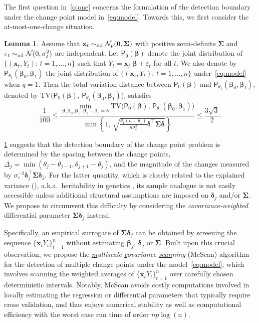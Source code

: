 \documentclass[11pt, a4paper]{article}
\newcommand{\mbf}{\mathbf}
\newcommand{\mc}{\mathcal}
\newcommand{\vep}{\varepsilon}
\newcommand{\cp}{\theta}
\newcommand{\p}{\mathsf{P}}
\newcommand{\iid}{\text{\upshape iid}}
\theoremstyle{definition}
\theoremstyle{definition}
\theoremstyle{definition}
\newtheorem{lem}[thm]{Lemma}
\theoremstyle{definition}
\theoremstyle{definition}
\theoremstyle{remark}
\theoremstyle{definition}
\theoremstyle{definition}
\theoremstyle{definition}
\begin{document}
The first question in~\ref{q:one} concerns the formulation of the detection boundary under the change point model in~\eqref{eq:model}. 
Towards this, we first consider the at-most-one-change situation.

\begin{lem}
	\label{lem:tv}
	Assume that $\mbf x_t \sim_{\iid} \mc N_p(\mbf 0, \bm\Sigma)$ with positive semi-definite $\bm\Sigma$ and $\vep_t \sim_{\iid} \mc N(0, \sigma_\vep^2)$ are independent. 
	Let $\p_0(\bm\beta)$ denote the joint distribution of $\{(\mbf x_t, Y_t): \,  t = 1, \ldots, n\}$ such that $Y_t = \mbf x_t^\top\bm\beta + \vep_t$ for all $t$. 
	We also denote by $\p_{\cp_1}(\bm\beta_0, \bm\beta_1)$ the joint distribution of $\{(\mbf x_t, Y_t): \, t = 1, \ldots, n\}$ under~\eqref{eq:model} when $q = 1$. 
	Then the total variation distance between $\p_0(\bm\beta)$ and $\p_{\cp_1}(\bm\beta_0, \bm\beta_1)$, denoted by $\mathrm{TV}\bigl( \p_0(\bm\beta),\, \p_{\cp_1}(\bm\beta_0, \bm\beta_1) \bigr)$, satisfies
	$$
	\frac{1}{100} \le \frac{\min_{\bm\beta, \bm\beta_0, \bm\beta_1: \, \bm\beta_1 - \bm\beta_0 = \bm\delta} \mathrm{TV} \bigl( \p_0(\bm\beta),\, \p_{\cp_1}(\bm\beta_0, \bm\beta_1) \bigr)}{\min\left\{ 1, \, \sqrt{\frac{\cp_1 (n - \cp_1)}{n \sigma_\vep^2}\bm\delta^\top \bm\Sigma \bm\delta}\right\}} \le \frac{3\sqrt{3}}{2}. 
	$$
\end{lem}

\cref{lem:tv} suggests that the detection boundary of the change point problem is determined by the spacing between the change points, $\Delta_j = \min(\cp_j - \cp_{j - 1}, \cp_{j + 1} - \cp_j)$,\label{ref:deltaj} and the magnitude of the changes measured by $\sigma_\vep^{-2} \bm\delta_j^\top \bm\Sigma \bm\delta_j$. 
For the latter quantity, which is closely related to the explained variance (\citealp{VerGas18, tony2020semisupervised}), a.k.a.\ heritability in genetics \citep{Mah08},
its sample analogue is not easily accessible unless additional structural assumptions are imposed on $\bm\delta_j$ and/or $\bm\Sigma$. 
We propose to circumvent this difficulty by considering the {\it covariance-weighted} differential parameter $\bm\Sigma \bm\delta_j$ instead. 

Specifically, an empirical surrogate of $\bm\Sigma \bm\delta_j$ can be obtained by screening the sequence $\{\mbf x_t Y_t \}_{t = 1}^n$ without estimating $\bm\beta_j$, $\bm\delta_j$ or $\bm\Sigma$. 
Built upon this crucial observation, we propose the {\it \underline{m}ultiscale \underline{c}ovariance \underline{scan}ning} (McScan) algorithm for the detection of multiple change points under the model~\eqref{eq:model}, which involves scanning the weighted averages of $\{\mbf x_t Y_t\}_{t = 1}^n$ over carefully chosen deterministic intervals. Notably, McScan avoids costly computations involved in locally estimating the regression or differential parameters that typically require cross validation, and thus enjoys numerical stability as well as computational efficiency with the worst case run time of order $np\log(n)$. 
\end{document}
